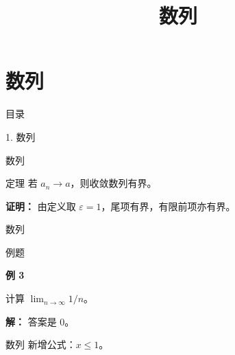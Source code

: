 \documentclass[aspectratio=169,10pt,fontset=fandol]{ctexbeamer}
\title{数列}
\begin{document}
\section{数列}
\begin{frame}[t,fragile]{目录}
\normalsize
{\color{blue}\normalsize 1. 数列\par}\vspace{0.22em}
\end{frame}
\begin{frame}[t,fragile]{数列}
\normalsize
\begin{block}{定理}
{\normalsize
若 $a_n\to a$，则收敛数列有界。
}
\end{block}
\pause
{\normalsize
\textbf{证明：}
由定义取 $\varepsilon=1$，尾项有界，有限前项亦有界。
}
\end{frame}
\begin{frame}[t,fragile]{数列}
\normalsize
\begin{block}{例题}
{\normalsize
\textbf{例 3}\par
计算 $\lim_{n\to\infty}1/n$。
}
\end{block}
\pause
{\normalsize
\textbf{解：}
答案是 $0$。
}
\end{frame}
\begin{frame}[t,fragile]{数列}
\normalsize
\normalsize
新增公式：$x\leqslant 1$。
\end{frame}
\end{document}
